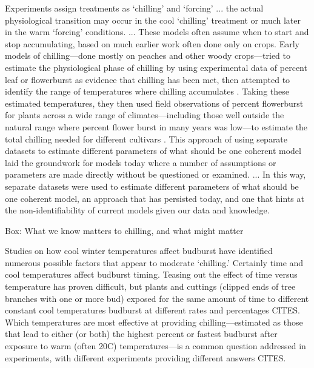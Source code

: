 \documentclass[11pt]{article}
\begin{document}
Experiments assign treatments as `chilling' and `forcing' ... the actual physiological transition may occur in the cool `chilling' treatment or much later in the warm `forcing' conditions. ...
These models often assume when to start and stop accumulating, based on much earlier work often done only on crops. Early models of chilling---done mostly on peaches and other woody crops---tried to estimate the physiological phase of chilling by using experimental data of percent leaf or flowerburst as evidence that chilling has been met, then attempted to identify the range of temperatures where chilling accumulates \citep{erez1971}. Taking these estimated temperatures, they then used field observations of percent flowerburst for plants across a wide range of climates---including those well outside the natural range where percent flower burst in many years was low---to estimate the total chilling needed for different cultivars \citep{richardson1974}. This approach of using separate datasets to estimate different parameters of what should be one coherent model laid the groundwork for models today where a number of assumptions or parameters are made directly without be questioned or examined. ...
In this way, separate datasets were used to estimate different parameters of what should be one coherent model, an approach that has persisted today, and one that hints at the non-identifiability of current models given our data and knowledge. 



{\sc Box: What we know matters to chilling, and what might matter} %

Studies on how cool winter temperatures affect budburst have identified numerous possible factors that appear to moderate `chilling.' Certainly time and cool temperatures affect budburst timing. Teasing out the effect of time versus temperature has proven difficult, but plants and cuttings (clipped ends of tree branches with one or more bud) exposed for the same amount of time to different constant cool temperatures budburst at different rates and percentages CITES. Which temperatures are most effective at providing chilling---estimated as those that lead to either (or both) the highest percent or fastest budburst after exposure to warm (often 20\degree C) temperatures---is a common question addressed in experiments, with different experiments providing different answers CITES. 
\end{document}
